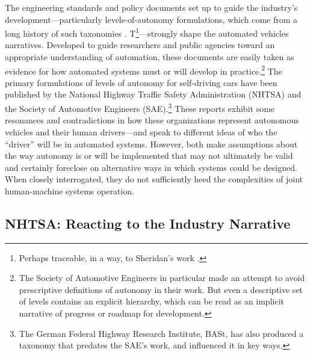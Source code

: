 The engineering standards and
policy documents set up to
guide the industry's development---particularly levels-of-autonomy
formulations, which come from a long history of such taxonomies \cite{parasuramanW} \cite{PSWickens} \cite{ALFUS} \cite{SMART}. T\footnote{Perhaps traceable, in a way, to 
  Sheridan's work \cite[p. 23]{DSB}.}---strongly shape the automated
vehicles narratives. Developed to guide
researchers and public agencies toward an appropriate understanding of
automation, these documents are easily taken
as evidence for how automated systems must or will develop in
practice.\footnote{The Society of Automotive Engineers in particular
  made an attempt to avoid prescriptive definitions of autonomy in
  their work. But even a descriptive set of levels contains an
  explicit hierarchy, which can be read as an implicit narrative of
  progress or roadmap for development.} The primary formulations of
levels of autonomy for self-driving cars 
have been published by the National Highway Traffic Safety
Administration (NHTSA) and the Society of Automotive Engineers
(SAE).\footnote{The German Federal Highway Research Institute, BASt,
 has also produced a taxonomy that predates the SAE's work, and
 influenced it in key ways.}
These reports exhibit some resonances and contradictions in how these
organizations represent autonomous vehicles and their human
drivers---and speak to different ideas of who the ``driver'' will be
in automated systems. However, both make assumptions about
the way autonomy is or will be implemented that may not ultimately be
valid and certainly foreclose on alternative ways in
which systems could be designed. When closely
interrogated, they do not sufficiently heed the
complexities of joint human-machine systems operation.



\subsection{NHTSA: Reacting to the Industry Narrative}

